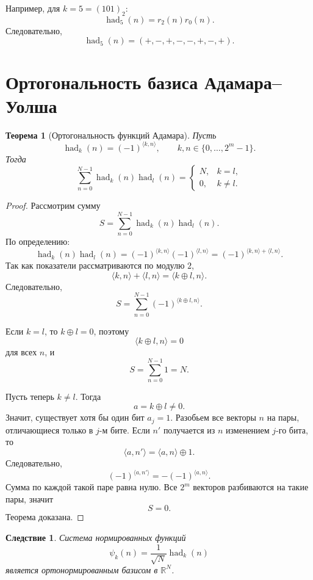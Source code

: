 \documentclass[12pt,a4paper]{article}
\newtheorem{theorem}{Теорема}
\newtheorem{corollary}{Следствие}
\begin{document}
Например, для $k=5=(101)_2$:
\[
    \operatorname{had}_5(n)
    =
    r_2(n)r_0(n).
\]
Следовательно,
\[
\operatorname{had}_5(n)
=
(+,-,+,-,-,+,-,+).
\]

\section{Ортогональность базиса Адамара--Уолша}

\begin{theorem}[Ортогональность функций Адамара]
Пусть
\[
    \operatorname{had}_k(n)=(-1)^{\langle k,n\rangle},
    \qquad k,n\in\{0,\ldots,2^m-1\}.
\]
Тогда
\[
    \sum_{n=0}^{N-1}\operatorname{had}_k(n)\operatorname{had}_l(n)
    =
    \begin{cases}
        N, & k=l,\\
        0, & k\ne l.
    \end{cases}
\]
\end{theorem}

\begin{proof}
Рассмотрим сумму
\[
S=\sum_{n=0}^{N-1}\operatorname{had}_k(n)\operatorname{had}_l(n).
\]
По определению:
\[
\operatorname{had}_k(n)\operatorname{had}_l(n)
=
(-1)^{\langle k,n\rangle}
(-1)^{\langle l,n\rangle}
=
(-1)^{\langle k,n\rangle+\langle l,n\rangle}.
\]
Так как показатели рассматриваются по модулю $2$,
\[
    \langle k,n\rangle+\langle l,n\rangle
    =
    \langle k\oplus l,n\rangle.
\]
Следовательно,
\[
    S=
    \sum_{n=0}^{N-1}(-1)^{\langle k\oplus l,n\rangle}.
\]

Если $k=l$, то $k\oplus l=0$, поэтому
\[
    \langle k\oplus l,n\rangle=0
\]
для всех $n$, и
\[
    S=\sum_{n=0}^{N-1}1=N.
\]

Пусть теперь $k\ne l$. Тогда
\[
    a=k\oplus l\ne 0.
\]
Значит, существует хотя бы один бит $a_j=1$. Разобьем все векторы $n$ на пары, отличающиеся только в $j$-м бите. Если $n'$ получается из $n$ изменением $j$-го бита, то
\[
    \langle a,n'\rangle
    =
    \langle a,n\rangle\oplus 1.
\]
Следовательно,
\[
    (-1)^{\langle a,n'\rangle}
    =
    -(-1)^{\langle a,n\rangle}.
\]
Сумма по каждой такой паре равна нулю. Все $2^m$ векторов разбиваются на такие пары, значит
\[
    S=0.
\]
Теорема доказана.
\end{proof}

\begin{corollary}
Система нормированных функций
\[
    \psi_k(n)=\frac{1}{\sqrt{N}}\operatorname{had}_k(n)
\]
является ортонормированным базисом в $\mathbb{R}^N$.
\end{corollary}
\end{document}
